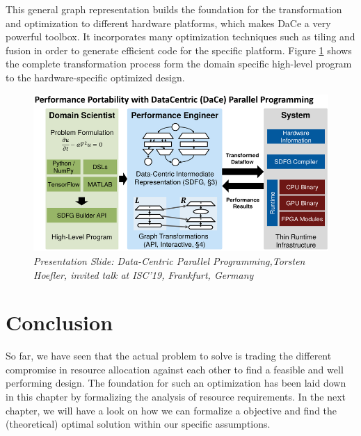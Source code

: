 This general graph representation builds the foundation for the transformation and optimization to different hardware platforms, which makes DaCe a very powerful toolbox. It incorporates many optimization techniques such as tiling and fusion in order to generate efficient code for the specific platform. Figure \ref{fig:dace} shows the complete transformation process form the domain specific high-level program to the hardware-specific optimized design.
\begin{figure}[h]
	\centering
	\includegraphics[width=1.0\textwidth]{images/dace.png}
	\caption{ \textit{Presentation Slide: Data-Centric Parallel Programming,Torsten Hoefler, invited talk at ISC’19, Frankfurt, Germany}}
	\label{fig:dace}
\end{figure}




\section{Conclusion}
So far, we have seen that the actual problem to solve is trading the different compromise in resource allocation against each other to find a feasible and well performing design. The foundation for such an optimization has been laid down in this chapter by formalizing the analysis of resource requirements. In the next chapter, we will have a look on how we can formalize a objective and find the (theoretical) optimal solution within our specific assumptions.












